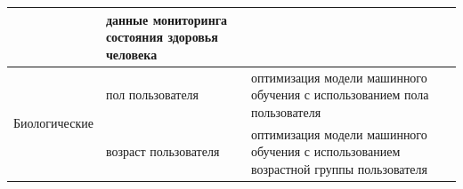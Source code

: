 \begin{table}
\begin{table}[H]
\begin{center}
\begin{tabular}{|p{4cm}|p{8cm}|p{12cm}|}
			\cline{2-2}
			& данные мониторинга состояния здоровья человека &  \\
			\hline\hline
			\multirow{2}{*}{Биологические} & пол пользователя & оптимизация модели машинного обучения с использованием пола пользователя \\
			\cline{2-3}
			& возраст пользователя & оптимизация модели машинного обучения с использованием возрастной группы пользователя  \\
 			\hline
		\end{tabular}
	\end{center}
\end{table}
\end{table}

\pagebreak